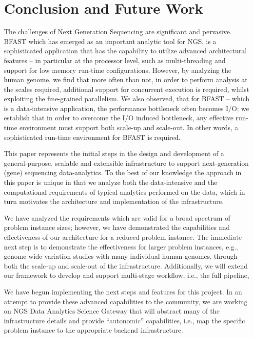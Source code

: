 \documentclass{cpeauth}
\begin{document}
\section{Conclusion and Future Work}

The challenges of Next Generation Sequencing are significant
and pervasive.
BFAST which has emerged as an important analytic tool for NGS, is  a sophisticated application that has the
capability to utilize advanced architectural features -- in particular
at the processor level, such as multi-threading and support for low
memory run-time configurations. However, by analyzing the human
genome, we find that more often than not, in order to perform analysis
at the scales required, additional support for concurrent execution is
required, whilst exploiting the fine-grained parallelism. We also
observed, that for BFAST -- which is a data-intensive application,
the performance bottleneck often becomes I/O; we establish that in
order to overcome the I/O induced bottleneck, any effective run-time
environment must support both scale-up and scale-out. In other words,
a sophisticated run-time environment for BFAST is required.

This paper represents the initial steps in the design and development
of a general-purpose, scalable and extensible infrastructure to
support next-generation (gene) sequencing data-analytics. To the best
of our knowledge the approach in this paper is unique in that we
analyze both the data-intensive and the computational requirements of
typical analytics performed on the data, which in turn motivates the
architecture and implementation of the infrastructure. 

We have analyzed the requirements which are valid for a broad spectrum
of problem instance sizes; however, we have demonstrated the
capabilities and effectiveness of our architecture for a reduced
problem instance. The immediate next step is to demonstrate the
effectiveness for larger problem instances, e.g., genome wide
variation studies with many individual human-genomes, through both the
scale-up and scale-out of the infrastructure.  Additionally, we will
extend our framework to develop and support multi-stage workflow,
i.e., the full pipeline,
 
We have begun implementing the next steps and features for this
project. In an attempt to provide these advanced capabilities to the
community, we are working on NGS Data Analytics Science Gateway that
will abstract many of the infrastructure details and provide
``autonomic'' capabilities, i.e., map the specific problem instance to
the appropriate backend infrastructure.
\end{document}
